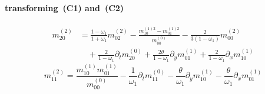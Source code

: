 \documentclass{article}
\begin{document}
  \paragraph{transforming~(C1) and~(C2)}
  \begin{equation}
    \tag{C3}
    \begin{aligned}
      m_{20}^{(2)} &= \frac{1-\omega_1}{1+\omega_1}m_{02}^{(2)}
      - \frac{ m_{10}^{(1)2} - m_{01}^{(1)2}}{m_{00}^{(0)}} - \frac{ 2}{3(1-\omega_1)}m_{00}^{(2)}
      \\&\quad
      + \frac{2}{1-\omega_1}\partial_t m_{20}^{(0)} + \frac{2\theta}{1-\omega_1}\partial_y m_{01}^{(1)} + \frac{2}{1-\omega_1}\partial_x m_{10}^{(1)}
    \end{aligned}
  \end{equation}
  \begin{equation}
    \tag{C4}
    m_{11}^{(2)} =  \frac{ m_{10}^{(1)}m_{01}^{(1)}}{m_{00}^{(0)}} - \frac{1}{\omega_1} \partial_t m_{11}^{(0)} - \frac{\theta}{\omega_1}\partial_y m_{10}^{(1)} - \frac{\theta}{\omega_1}\partial_x m_{01}^{(1)}
  \end{equation}
\end{document}
